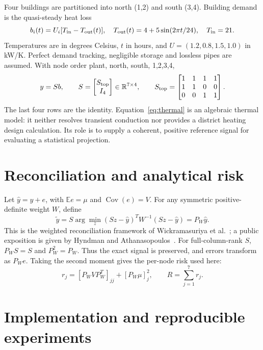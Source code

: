 \documentclass[10pt,a4paper]{article}
\begin{document}
Four buildings are partitioned into north (1,2) and south (3,4). Building demand
is the quasi-steady heat loss
\begin{equation}
 b_i(t)=U_i[T_{\rm in}-T_{\rm out}(t)],\quad
 T_{\rm out}(t)=4+5\sin(2\pi t/24),\quad T_{\rm in}=21.
 \label{eq:thermal}
\end{equation}
Temperatures are in degrees Celsius, $t$ in hours, and
$U=(1.2,0.8,1.5,1.0)$ in kW/K. Perfect demand tracking, negligible storage and
lossless pipes are assumed. With node order plant, north, south, 1,2,3,4,
\begin{equation}
 y=S b,\qquad S=\begin{bmatrix}S_{\rm top}\\I_4\end{bmatrix}
 \in\mathbb R^{7\times4},\qquad
 S_{\rm top}=\begin{bmatrix}1&1&1&1\\1&1&0&0\\0&0&1&1\end{bmatrix}.
 \label{eq:summing}
\end{equation}
The last four rows are the identity. Equation~\eqref{eq:thermal} is an algebraic
thermal model: it neither resolves transient conduction nor provides a district
heating design calculation. Its role is to supply a coherent, positive reference
signal for evaluating a statistical projection.

\section{Reconciliation and analytical risk}
Let $\hat y=y+e$, with $\mathbb E e=\mu$ and $\operatorname{Cov}(e)=V$.
For any symmetric positive-definite weight $W$, define
\begin{equation}
 \tilde y=S\arg\min_z(Sz-\hat y)^TW^{-1}(Sz-\hat y)=P_W\hat y.
 \label{eq:projection}
\end{equation}
This is the weighted reconciliation framework of
Wickramasuriya et al.~\cite{mint}; a public exposition is given by
Hyndman and Athanasopoulos~\cite{fpp}. For full-column-rank $S$,
$P_WS=S$ and $P_W^2=P_W$. Thus the exact signal is preserved, and errors transform
as $P_We$. Taking the second moment gives the per-node risk used here:
\begin{equation}
 r_j=[P_WVP_W^T]_{jj}+[P_W\mu]_j^2,\qquad R=\sum_{j=1}^{7}r_j.
 \label{eq:risk}
\end{equation}
\newpage

\section{Implementation and reproducible experiments}
\end{document}
